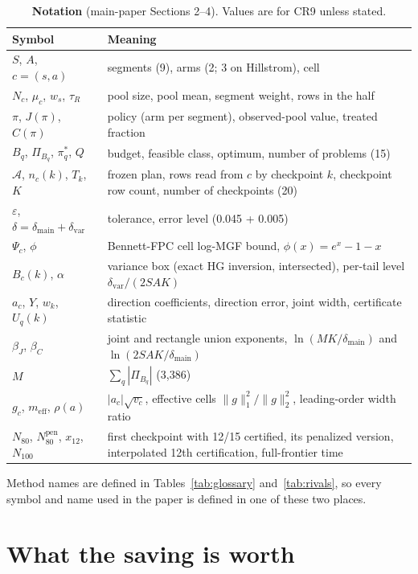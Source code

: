 \documentclass[sigconf,anonymous,review]{acmart}
\newcommand{\cA}{\mathcal{A}}
\newcommand{\eps}{\varepsilon}
\newcommand{\dmain}{\delta_{\text{main}}}
\newcommand{\dvar}{\delta_{\text{var}}}
\newcommand{\Npen}{N_{80}^{\text{pen}}}
\newcommand{\meff}{m_{\text{eff}}}
\begin{document}
\begin{table}[H]
\caption{\textbf{Notation} (main-paper Sections 2--4). Values are for CR9 unless stated.}
\label{tab:notation}
\footnotesize
\setlength{\tabcolsep}{3pt}
\begin{tabular}{@{}l>{\raggedright\arraybackslash}p{5.3cm}@{}}
\toprule
Symbol & Meaning \\
\midrule
$S$, $A$, $c = (s, a)$ & segments (9), arms (2; 3 on Hillstrom), cell \\
$N_c$, $\mu_c$, $w_s$, $\tau_R$ & pool size, pool mean, segment weight, rows in the half \\
$\pi$, $J(\pi)$, $C(\pi)$ & policy (arm per segment), observed-pool value, treated fraction \\
$B_q$, $\Pi_{B_q}$, $\pi^*_q$, $Q$ & budget, feasible class, optimum, number of problems (15) \\
$\cA$, $n_c(k)$, $T_k$, $K$ & frozen plan, rows read from $c$ by checkpoint $k$, checkpoint row count, number of checkpoints (20) \\
$\eps$, $\delta = \dmain + \dvar$ & tolerance, error level (0.045 + 0.005) \\
$\Psi_c$, $\phi$ & Bennett-FPC cell log-MGF bound, $\phi(x) = e^x - 1 - x$ \\
$B_c(k)$, $\alpha$ & variance box (exact HG inversion, intersected), per-tail level $\dvar/(2SAK)$ \\
$a_c$, $Y$, $w_k$, $U_q(k)$ & direction coefficients, direction error, joint width, certificate statistic \\
$\beta_J$, $\beta_C$ & joint and rectangle union exponents, $\ln(MK/\dmain)$ and $\ln(2SAK/\dmain)$ \\
$M$ & $\sum_q |\Pi_{B_q}|$ (3,386) \\
$g_c$, $\meff$, $\rho(a)$ & $|a_c|\sqrt{v_c}$, effective cells $\|g\|_1^2/\|g\|_2^2$, leading-order width ratio \\
$N_{80}$, $\Npen$, $x_{12}$, $N_{100}$ & first checkpoint with 12/15 certified, its penalized version, interpolated 12th certification, full-frontier time \\
\bottomrule
\end{tabular}
\end{table}

\noindent Method names are defined in Tables~\ref{tab:glossary} and~\ref{tab:rivals}, so every symbol and name used in the paper is defined in one of these two places.

\section{What the saving is worth}\label{app:cost}
\end{document}

